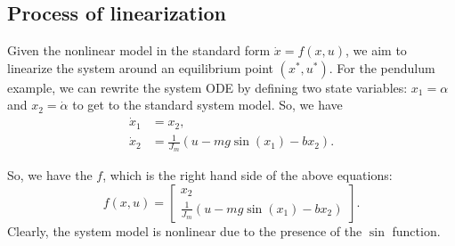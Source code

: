 \documentclass{ee122_notes}
\begin{document}
\subsection{Process of linearization}
Given the nonlinear model in the standard form $\dot x = f(x,u)$, we aim to linearize the system around an equilibrium point $(x^*, u^*)$. For the pendulum example, we can rewrite the system ODE by defining two state variables: $x_1 = \alpha$ and $x_2 = \dot \alpha$ to get to the standard system model. So, we have 
\[\begin{aligned}
\dot x_1 &= x_2,\\
\dot x_2 &= \frac{1}{J_m}(u - mg\sin(x_1) - b x_2).
\end{aligned}\]

So, we have the $f$, which is the right hand side of the above equations:
\[f(x,u) = \begin{bmatrix} x_2 \\ \frac{1}{J_m}(u - mg\sin(x_1) - b x_2) \end{bmatrix}.\]
Clearly, the system model is nonlinear due to the presence of the $\sin$ function. 
\end{document}
